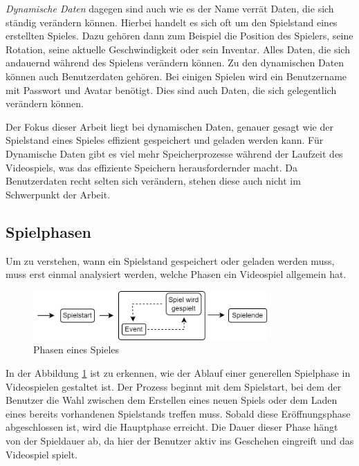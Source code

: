 \textit{Dynamische Daten} dagegen sind auch wie es der Name verrät Daten, die sich ständig verändern können. Hierbei handelt es sich oft um den Spielstand eines erstellten Spieles. Dazu gehören dann zum Beispiel die Position des Spielers, seine Rotation, seine aktuelle Geschwindigkeit oder sein Inventar. Alles Daten, die sich andauernd während des Spielens verändern können. Zu den dynamischen Daten können auch Benutzerdaten gehören. Bei einigen Spielen wird ein Benutzername mit Passwort und Avatar benötigt. Dies sind auch Daten, die sich gelegentlich verändern können.

Der Fokus dieser Arbeit liegt bei dynamischen Daten, genauer gesagt wie der Spielstand eines Spieles effizient gespeichert und geladen werden kann. Für Dynamische Daten gibt es viel mehr Speicherprozesse während der Laufzeit des Videospiels, was das effiziente Speichern herausfordernder macht. Da Benutzerdaten recht selten sich verändern, stehen diese auch nicht im Schwerpunkt der Arbeit.  


\subsection{Spielphasen}
Um zu verstehen, wann ein Spielstand gespeichert oder geladen werden muss, muss erst einmal analysiert werden, welche Phasen ein Videospiel allgemein hat.

\begin{figure}[htp]
    \centering
    \includegraphics[width=0.8\textwidth]{images/Spielphasen.png}
    \caption{Phasen eines Spieles}
    \label{fig:spielphasen}
\end{figure}

In der Abbildung \ref{fig:spielphasen} ist zu erkennen, wie der Ablauf einer generellen Spielphase in Videospielen gestaltet ist. Der Prozess beginnt mit dem Spielstart, bei dem der Benutzer die Wahl zwischen dem Erstellen eines neuen Spiels oder dem Laden eines bereits vorhandenen Spielstands treffen muss. Sobald diese Eröffnungsphase abgeschlossen ist, wird die Hauptphase erreicht. Die Dauer dieser Phase hängt von der Spieldauer ab, da hier der Benutzer aktiv ins Geschehen eingreift und das Videospiel spielt.

